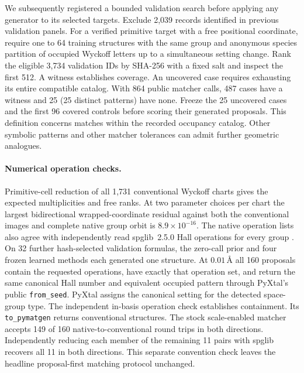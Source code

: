 We subsequently registered a bounded validation search before applying any generator to its
selected targets. Exclude 2,039 records identified in previous validation panels. For a
verified primitive target with a free positional coordinate, require one to 64 training
structures with the same group and anonymous species partition of occupied Wyckoff letters
up to a simultaneous setting change. Rank the eligible 3,734 validation IDs by SHA-256 with
a fixed salt and inspect the first 512. A witness establishes coverage. An uncovered case
requires exhausting its entire compatible catalog. With 864 public matcher calls, 487 cases
have a witness and 25 (25 distinct patterns) have none. Freeze the 25 uncovered cases and the
first 96 covered controls before scoring their generated proposals. This definition concerns
matches within the recorded occupancy catalog. Other symbolic patterns and other matcher
tolerances can admit further geometric analogues.

\paragraph{Numerical operation checks.}
Primitive-cell reduction of all 1,731 conventional Wyckoff charts gives the expected
multiplicities and free ranks. At two parameter choices per chart the largest bidirectional
wrapped-coordinate residual against both the conventional images and complete native group
orbit is \(8.9\times10^{-16}\). The native operation lists also agree with independently
read spglib~2.5.0 Hall operations for every group \cite{spglib}. On 32 further hash-selected validation formulas,
the zero-call prior and four frozen learned methods each generated one structure. At
\(0.01\,\text{\AA}\) all 160 proposals contain the requested operations, have exactly that
operation set, and return the same canonical Hall number and equivalent occupied pattern through
PyXtal's public \texttt{from\_seed}. PyXtal assigns the canonical setting for the detected
space-group type. The independent in-basis operation check establishes containment.
Its \texttt{to\_pymatgen} returns conventional structures.
The stock scale-enabled matcher accepts 149 of 160 native-to-conventional round trips in
both directions. Independently reducing each member of the remaining 11 pairs with spglib
recovers all 11 in both directions. This separate convention check leaves the headline
proposal-first matching protocol unchanged.
